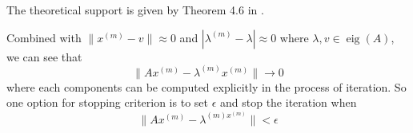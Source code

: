 \documentclass[12pt]{article}
\begin{document}
The theoretical support is given by Theorem 4.6 in \cite{borm2012numerical}.

Combined with $\|x^{(m)}-v\|\approx 0$ and $|\lambda^{(m)} -\lambda|\approx 0$ where $\lambda, v\in\operatorname{eig}(A)$, we can see that
$$
\|Ax^{(m)}-\lambda^{(m)}x^{(m)}\| \to 0
$$
where each components can be computed explicitly in the process of iteration. So one option for stopping criterion is to set $\epsilon$ and stop the iteration when
$$
\|Ax^{(m)}-\lambda^{(m)x^{(m)}}\| < \epsilon
$$


\end{document}
